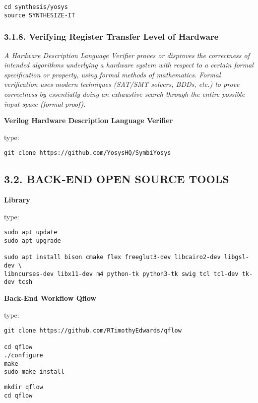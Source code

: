 \documentclass[]{article}
\begin{document}
\begin{verbatim}
cd synthesis/yosys
source SYNTHESIZE-IT
\end{verbatim}

\subsubsection{3.1.8. Verifying Register Transfer Level of
Hardware}\label{verifying-register-transfer-level-of-hardware}

\emph{A Hardware Description Language Verifier proves or disproves the
correctness of intended algorithms underlying a hardware system with
respect to a certain formal specification or property, using formal
methods of mathematics. Formal verification uses modern techniques
(SAT/SMT solvers, BDDs, etc.) to prove correctness by essentially doing
an exhaustive search through the entire possible input space (formal
proof).}

\textbf{Verilog Hardware Description Language Verifier}

type:

\begin{verbatim}
git clone https://github.com/YosysHQ/SymbiYosys
\end{verbatim}

\subsection{3.2. BACK-END OPEN SOURCE
TOOLS}\label{back-end-open-source-tools}

\textbf{Library}

type:

\begin{verbatim}
sudo apt update
sudo apt upgrade

sudo apt install bison cmake flex freeglut3-dev libcairo2-dev libgsl-dev \
libncurses-dev libx11-dev m4 python-tk python3-tk swig tcl tcl-dev tk-dev tcsh
\end{verbatim}

\textbf{Back-End Workflow Qflow}

type:

\begin{verbatim}
git clone https://github.com/RTimothyEdwards/qflow

cd qflow
./configure
make
sudo make install
\end{verbatim}

\begin{verbatim}
mkdir qflow
cd qflow
\end{verbatim}
\end{document}
